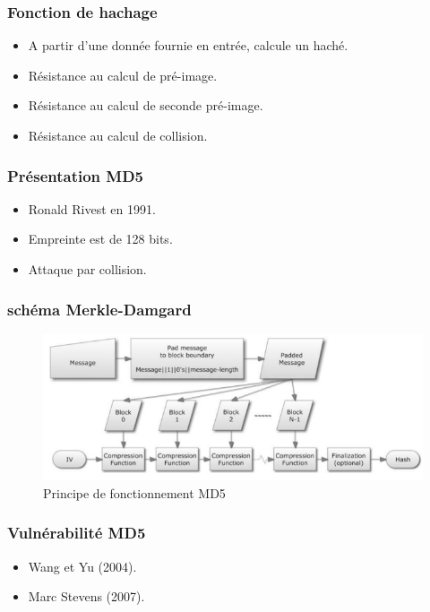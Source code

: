 \begin{frame}
\frametitle{Fonction de hachage}


\begin{itemize}
\item A partir d'une donnée fournie en entrée, calcule un haché.\\
\item Résistance au calcul de pré-image.
\item Résistance au calcul de seconde pré-image.
\item Résistance au calcul de collision.\\
\end{itemize}
\end{frame}

\begin{frame}
\frametitle{Présentation MD5}

\begin{itemize}
\item Ronald Rivest en 1991.\\
\item Empreinte est de 128 bits.\\
\item Attaque par collision.
\end{itemize}
\end{frame}

\begin{frame}
\frametitle{schéma Merkle-Damgard}
\begin{figure}[h!]
\center
 \includegraphics[width=11.5cm]{images/md.png}
 
  \caption{Principe de fonctionnement MD5}
\end{figure}
\end{frame}


\begin{frame}
\frametitle{Vulnérabilité MD5}

\begin{itemize}
\item Wang et Yu (2004).\\
\item Marc Stevens (2007).\\
\end{itemize}
\end{frame}
